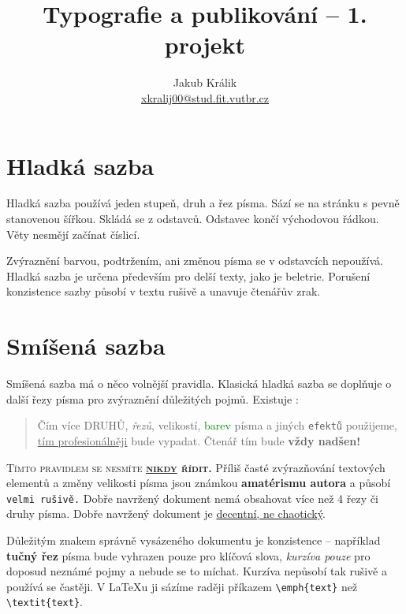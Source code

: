 \documentclass[10pt, a4paper, twocolumn]{article}
\title{Typografie a publikování -- 1. projekt}
\author{Jakub Králik \\ \href{mailto:xkralij00@stud.fit.vutbr.cz}{xkralij00@stud.fit.vutbr.cz}}
\date{}
\begin{document}
\maketitle

\hypertarget{first}{\section{Hladká sazba}}

Hladká sazba používá jeden stupeň, druh a řez písma.
Sází se na stránku s pevně stanovenou šířkou.
Skládá se z odstavců. Odstavec končí východovou řádkou.
Věty nesmějí začínat číslicí.

Zvýraznění barvou, podtržením, ani změnou písma se v odstavcích nepoužívá.
Hladká sazba je určena především pro delší texty, jako je beletrie.
Porušení konzistence sazby působí v textu rušivě a unavuje čtenářův zrak.
    
\hypertarget{second}{\section{Smíšená sazba}}

Smíšená sazba má o něco volnější pravidla.
Klasická hladká sazba se doplňuje o další řezy písma pro zvýraznění důležitých pojmů.
Existuje :

\begin{quotation}
    Čím více {\scriptsize{\MakeUppercase{druhů}}}, \emph{řezů}, {\scriptsize{velikostí}}, \textcolor{green}{barev} písma a jiných \texttt{efektů} použijeme, \underline{tím profesionálněji} bude {\selectfont{dokument}} vypadat. Čtenář tím bude {\LARGE\textbf{vždy nadšen!}}
\end{quotation}




{\textsc{Tímto pravidlem se nesmíte \textbf{\underline{nikdy} řídit.}}}
Příliš časté zvýrazňování textových elementů a změny {\tiny{velikosti}} písma jsou známkou {\textbf{amatérismu autora}} a působí \texttt{velmi rušivě.}
Dobře navržený dokument nemá obsahovat více než 4 řezy či druhy písma.
Dobře navržený dokument je \underline{decentní, ne chaotický}.

Důležitým znakem správně vysázeného dokumentu je konzistence -- například {\textbf{tučný řez}} písma bude vyhrazen pouze pro klíčová slova, {\emph{kurzíva pouze}} pro doposud neznámé pojmy a nebude se to míchat.
Kurzíva nepůsobí tak rušivě a používá se častěji.
V \LaTeX u ji sázíme raději příkazem \texttt{\textbackslash emph\{text\}} než \texttt{\textbackslash textit\{text\}}.
\end{document}
